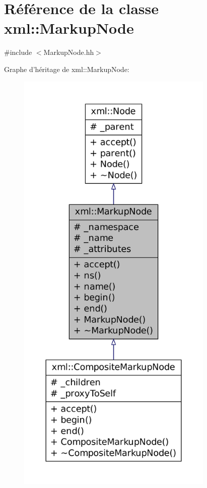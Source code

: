 \hypertarget{classxml_1_1_markup_node}{
\section{Référence de la classe xml::MarkupNode}
\label{classxml_1_1_markup_node}
}


{\ttfamily \#include $<$MarkupNode.hh$>$}



Graphe d'héritage de xml::MarkupNode:\nopagebreak
\begin{figure}[H]
\begin{center}
\leavevmode
\includegraphics[height=600pt]{classxml_1_1_markup_node__inherit__graph}
\end{center}
\end{figure}



